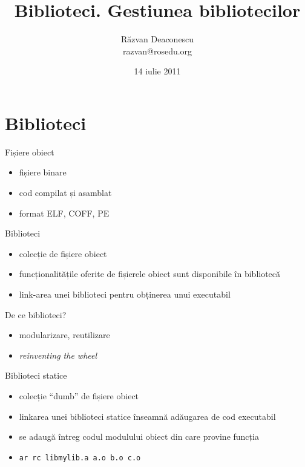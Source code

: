 \documentclass{simple}
\title[Biblioteci]{Biblioteci. Gestiunea bibliotecilor}
\institute{Întâlnirile lunare RLUG -- Iulie 2011}
\author[Răzvan Deaconescu]{Răzvan Deaconescu \\
    razvan@rosedu.org}
\date{14 iulie 2011}
\begin{document}
\frame{\titlepage}

\section{Biblioteci}

\begin{frame}{Fișiere obiect}
  \begin{itemize}
    \item fișiere binare
    \item cod compilat și asamblat
    \item format ELF, COFF, PE
  \end{itemize}
\end{frame}

\begin{frame}{Biblioteci}
  \begin{itemize}
    \item colecție de fișiere obiect
    \item funcționalitățile oferite de fișierele obiect sunt disponibile în
    bibliotecă
    \item link-area unei biblioteci pentru obținerea unui executabil
  \end{itemize}
\end{frame}

\begin{frame}{De ce biblioteci?}
  \begin{itemize}
    \item modularizare, reutilizare
    \item \textit{reinventing the wheel}
  \end{itemize}
\end{frame}

\begin{frame}{Biblioteci statice}
  \begin{itemize}
    \item colecție ``dumb'' de fișiere obiect
    \item linkarea unei biblioteci statice înseamnă adăugarea de cod
    executabil
    \item se adaugă întreg codul modulului obiect din care provine funcția
    \item \texttt{ar rc libmylib.a a.o b.o c.o}
  \end{itemize}
\end{frame}
\end{document}
